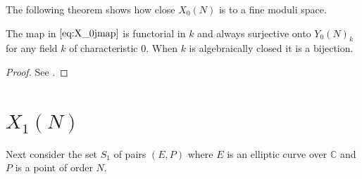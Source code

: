 \documentclass[11pt]{article}
\newcommand{\BB}[1]{\mathbb{#1}} %
\newcommand{\CC}{\BB{C}}
\theoremstyle{plain}
\theoremstyle{remark}
\begin{document}
The following theorem shows how close $X_0(N)$ is to a fine moduli space.

\begin{thm}
	The map in $\autoref{eq:X_0jmap}$ is functorial in $k$ and always surjective onto $Y_0(N)_k$ for any field $k$ of characteristic $0$. When $k$ is algebraically closed it is a bijection.
\end{thm}
\begin{proof}
	See \cite[Chapter V Theorem 2.7]{milne}.
\end{proof}

\section{$X_1(N)$}

Next consider the set $S_1$ of pairs $(E,P)$ where $E$ is an elliptic curve over $\CC$ and $P$ is a point of order $N$.
\end{document}
